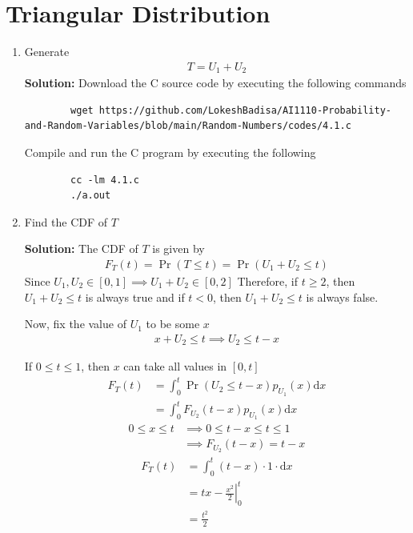 \documentclass[journal,12pt,twocolumn]{IEEEtran}
\newcommand{\solution}{\noindent \textbf{Solution: }}
\providecommand{\pr}[1]{\ensuremath{\Pr\left(#1\right)}}
\providecommand{\der}[1]{\mathrm{d} #1}
\numberwithin{equation}{section}
\renewcommand\thesection{\arabic{section}}
\begin{document}
	\section{Triangular Distribution}
	\begin{enumerate}[label=\thesection.\arabic*,ref=\thesection.\theenumi]
	\item Generate 
	\begin{align}
		T = U_1+U_2
	\end{align}
	\solution Download the C source code by executing the following commands
	\begin{lstlisting}
		wget https://github.com/LokeshBadisa/AI1110-Probability-and-Random-Variables/blob/main/Random-Numbers/codes/4.1.c
	\end{lstlisting}
	Compile and run the C program by executing the following
	\begin{lstlisting}
		cc -lm 4.1.c
		./a.out
	\end{lstlisting}
	
	\item Find the CDF of $T$
	
	\solution The CDF of $T$ is given by
	\begin{align}
		F_T(t) = \pr{T \le t} = \pr{U_1 + U_2 \le t}	
	\end{align}		
	Since $U_1, U_2 \in [0,1] \implies U_1 + U_2 \in [0,2]$
	Therefore, if $t \ge 2$, then $U_1 + U_2 \le t$ is always true and if $t < 0$, then $U_1 + U_2 \le t$ is always false.
	
	Now, fix the value of $U_1$ to be some $x$
	\begin{align}
		x + U_2 \le t \implies U_2 \le t - x
	\end{align}
	
	If $0 \le t \le 1$, then $x$ can take all values in $[0,t]$
	\begin{align}
		F_T(t)	&= \int_0^t \pr{U_2 \le t - x} p_{U_1}(x) \der{x} \\
		&= \int_0^t F_{U_2}(t-x) p_{U_1}(x) \der{x}
	\end{align}
	\begin{align}
		0 \le x \le t &\implies 0 \le t - x \le t \le 1 \\
		&\implies F_{U_2}(t-x) = t - x
	\end{align}
	\begin{align}
		F_T(t) &= \int_0^t (t-x) \cdot 1 \cdot \der{x} \\
		&= \left. tx - \frac{x^2}{2} \right|_0^t \\
		&= \frac{t^2}{2}
	\end{align}
	

\end{enumerate}
\end{document}
